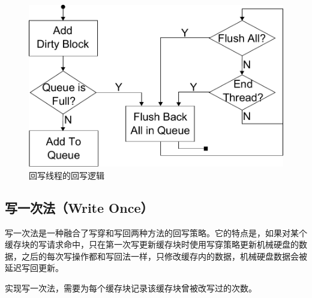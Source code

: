 \begin{figure}[H]
\centering
\includegraphics[width=0.6\linewidth]{./graph/write-back-thread}
\caption{回写线程的回写逻辑}
\label{fig:write-back-thread}
\end{figure}

\subsection{写一次法（Write Once）}
写一次法是一种融合了写穿和写回两种方法的回写策略。它的特点是，如果对某个缓存块的写请求命中，只在第一次写更新缓存块时使用写穿策略更新机械硬盘的数据，之后的每次写操作都和写回法一样，只修改缓存内的数据，机械硬盘数据会被延迟写回更新。

实现写一次法，需要为每个缓存块记录该缓存块曾被改写过的次数。

